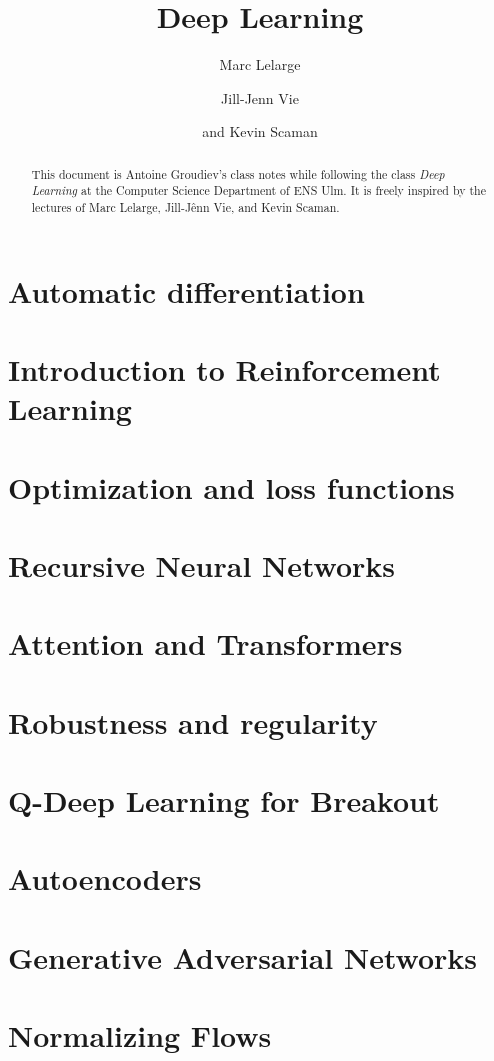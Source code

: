 \documentclass[toc, titlepaged]{../cs-classes/cs-classes}
\title{Deep Learning}
\author{Marc Lelarge\and Jill-Jenn Vie\and and Kevin Scaman}
\begin{document}
\begin{abstract}
    This document is Antoine Groudiev's class notes while following the class \emph{Deep Learning} at the Computer Science Department of ENS Ulm. It is freely inspired by the lectures of Marc Lelarge, Jill-Jênn Vie, and Kevin Scaman. 
\end{abstract}



\section{Automatic differentiation}

\section{Introduction to Reinforcement Learning}

\section{Optimization and loss functions}



\section{Recursive Neural Networks}

\section{Attention and Transformers}

\section{Robustness and regularity}

\section{Q-Deep Learning for Breakout}

\section{Autoencoders}

\section{Generative Adversarial Networks}

\section{Normalizing Flows}
\end{document}
